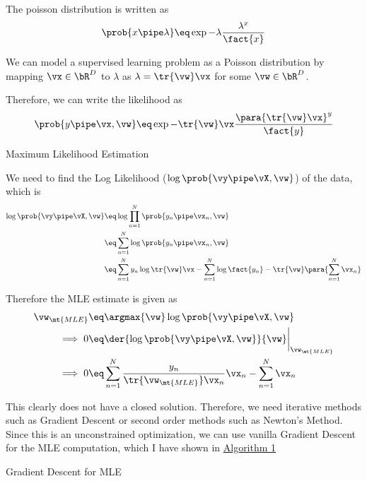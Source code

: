\documentclass{article}
\begin{document}
\begin{question}

	The poisson distribution is written as
	\begin{align*}
		\prob{x \pipe \lambda}	\eq	\exp{- \lambda} \frac{\lambda^x}{\fact{x}}
	\end{align*}

	We can model a supervised learning problem as a Poisson distribution by mapping $\vx \in \bR^D$ to $\lambda$ as $\lambda = \tr{\vw} \vx$ for some $\vw \in \bR^D$.

	Therefore, we can write the likelihood as
	\begin{align*}
		\prob{y \pipe \vx, \vw}	\eq	\exp{-\tr{\vw} \vx} \frac{\para{\tr{\vw} \vx}^y}{\fact{y}}
	\end{align*}

	\begin{qsubsection}{Maximum Likelihood Estimation}

		We need to find the Log Likelihood ($\log{\prob{\vy \pipe \vX, \vw}}$) of the data, which is
		\begin{align*}
			\log{\prob{\vy \pipe \vX, \vw}}	&\eq	\log{\prod_{n = 1}^N \prob{y_n \pipe \vx_n, \vw}} \\
			&\eq	\sum_{n = 1}^N \log{\prob{y_n \pipe \vx_n, \vw}} \\
			&\eq	\sum_{n = 1}^N y_n \log{\tr{\vw} \vx} - \sum_{n = 1}^N \log{\fact{y_n}} - \tr{\vw} \para{\sum_{n = 1}^N \vx_n}
		\end{align*}

		Therefore the MLE estimate is given as
		\begin{align*}
			\vw_{\mt{MLE}}	&\eq	\argmax{\vw} \log{\prob{\vy \pipe \vX, \vw}} \\
			\implies 0		&\eq	\der{\log{\prob{\vy \pipe \vX, \vw}}}{\vw} \bigg|_{\vw_{\mt{MLE}}} \\
			\implies 0		&\eq	\sum_{n = 1}^{N} \frac{y_n}{\tr{\vw_{\mt{MLE}}} \vx_n} \vx_n - \sum_{n = 1}^N \vx_n
		\end{align*}

		This clearly does not have a closed solution. Therefore, we need iterative methods such as Gradient Descent or second order methods such as Newton's Method. Since this is an unconstrained optimization, we can use vanilla Gradient Descent for the MLE computation, which I have shown in \hyperlink{algo:1}{Algorithm 1}

		\begin{algo}[0.9\textwidth]{Gradient Descent for MLE}


\end{algo}
\end{qsubsection}
\end{question}
\end{document}
